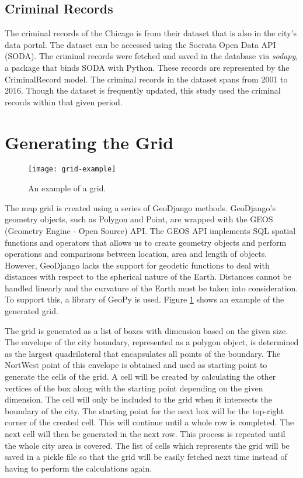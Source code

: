     \subsection{Criminal Records}
        The criminal records of the Chicago is from their dataset that is also in the city's data portal. The dataset can be accessed using the Socrata Open Data API (SODA). The criminal records were fetched and saved in the database via \textit{sodapy}, a package that binds SODA with Python. These records are represented by the CriminalRecord model. The criminal records in the dataset spans from 2001 to 2016. Though the dataset is frequently updated, this study used the criminal records within that given period.

\section{Generating the Grid}
    \begin{figure}[H]
    \centering
    \texttt{[image: grid-example]}
    \caption{An example of a grid.}
    \label{fig:grid}
    \end{figure}
    The map grid is created using a series of GeoDjango methods. GeoDjango's geometry objects, such as Polygon and Point, are wrapped with the GEOS (Geometry Engine - Open Source) API. The GEOS API implements SQL spatial functions and operators that allows us to create geometry objects and perform operations and comparisons between location, area and length of objects. However, GeoDjango lacks the support for geodetic functions to deal with distances with respect to the spherical nature of the Earth. Distances cannot be handled linearly and the curvature of the Earth must be taken into consideration. To support this, a library of GeoPy is used. Figure \ref{fig:grid} shows an example of the generated grid.

    The grid is generated as a list of boxes with dimension based on the given size. The envelope of the city boundary, represented as a polygon object, is determined as the largest quadrilateral that encapsulates all points of the boundary. The NortWest point of this envelope is obtained and used as starting point to generate the cells of the grid. A cell will be created by calculating the other vertices of the box along with the starting point depending on the given dimension. The cell will only be included to the grid when it intersects the boundary of the city. The starting point for the next box will be the top-right corner of the created cell. This will continue until a whole row is completed. The next cell will then be generated in the next row. This process is repeated until the whole city area is covered. The list of cells which represents the grid will be saved in a pickle file so that the grid will be easily fetched next time instead of having to perform the calculations again.

